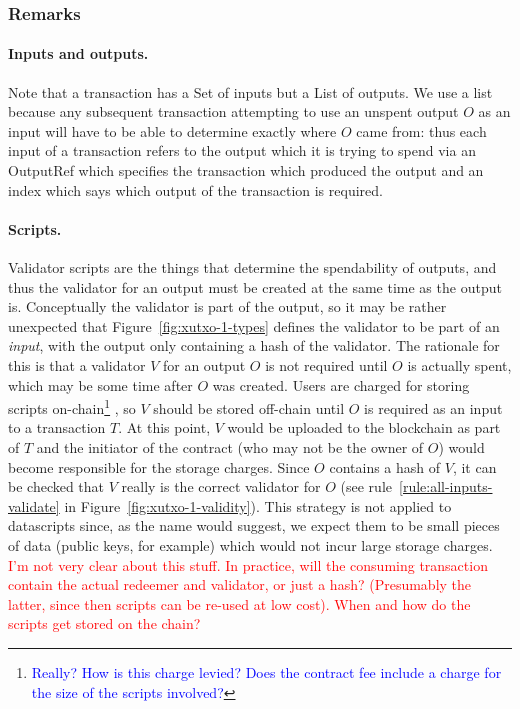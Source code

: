 \documentclass[a4paper]{article}
\newcommand{\red}[1]{\textcolor{red}{#1}}
\newcommand{\blue}[1]{\textcolor{blue}{#1}}
\newcommand{\bluefootnote}[1]{\blue{\footnote{\blue{#1}}}}
\newcommand{\s}{\textsf}  %
\theoremstyle{definition}  %
\begin{document}
\subsubsection{Remarks}
\paragraph{Inputs and outputs. } Note that a transaction has a
\textsf{Set} of inputs but a \textsf{List} of outputs. We use a list
because any subsequent transaction attempting to use an unspent output
$O$ as an input will have to be able to determine exactly where $O$
came from: thus each input of a transaction refers to the output which
it is trying to spend via an \s{OutputRef} which specifies the
transaction which produced the output and an index which says which
output of the transaction is required.

\paragraph{Scripts.}  Validator scripts are the things that determine
the spendability of outputs, and thus the validator for an output must
be created at the same time as the output is.  Conceptually the
validator is part of the output, so it may be rather unexpected that
Figure~\ref{fig:xutxo-1-types} defines the validator to be part of an
\textit{input}, with the output only containing a hash of the
validator.  The rationale for this is that a validator $V$ for an
output $O$ is not required until $O$ is actually spent, which may be
some time after $O$ was created.  Users are charged for storing
scripts on-chain\bluefootnote{Really? How is this charge levied?  Does
  the contract fee include a charge for the size of the scripts
  involved?} , so $V$ should be stored off-chain until $O$ is required
as an input to a transaction $T$.  At this point, $V$ would be
uploaded to the blockchain as part of $T$ and the initiator of the
contract (who may not be the owner of $O$) would become responsible
for the storage charges.  Since $O$ contains a hash of $V$, it can be
checked that $V$ really is the correct validator for $O$ (see
rule~\ref{rule:all-inputs-validate} in
Figure~\ref{fig:xutxo-1-validity}).  This strategy is not applied to
datascripts since, as the name would suggest, we expect them to be
small pieces of data (public keys, for example) which would not incur
large storage charges.  \red{I'm not very clear about this stuff.  In
  practice, will the consuming transaction contain the actual redeemer
  and validator, or just a hash? (Presumably the latter, since then
  scripts can be re-used at low cost).  When and how do the scripts
  get stored on the chain?}
\end{document}
